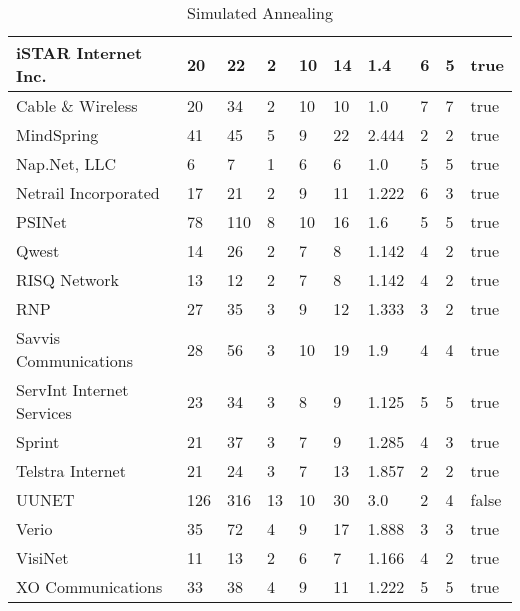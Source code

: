 \documentclass [12pt]{article}
\begin{document}
\begin {table}[H]
\begin{tabular}{ | l | l | l | l | l | l | l | l | l | l | }
    iSTAR Internet Inc. & 20 & 22 & 2 & 10 & 14 & 1.4 & 6 & 5 & true\\ \hline
    Cable \& Wireless & 20 & 34 & 2 & 10 & 10 & 1.0 & 7 & 7 & true\\ \hline
    MindSpring & 41 & 45 & 5 & 9 & 22 & 2.444 & 2 & 2 & true\\ \hline
    Nap.Net, LLC & 6 & 7 & 1 & 6 & 6 & 1.0 & 5 & 5 & true\\ \hline
    Netrail Incorporated & 17 & 21 & 2 & 9 & 11 & 1.222 & 6 & 3 & true\\ \hline
    PSINet & 78 & 110 & 8 & 10 & 16 & 1.6 & 5 & 5 & true\\ \hline
    Qwest & 14 & 26 & 2 & 7 & 8 & 1.142 & 4 & 2 & true\\ \hline
    RISQ Network & 13 & 12 & 2 & 7 & 8 & 1.142 & 4 & 2 & true\\ \hline
    RNP & 27 & 35 & 3 & 9 & 12 & 1.333 & 3 & 2 & true\\ \hline
    Savvis Communications & 28 & 56 & 3 & 10 & 19 & 1.9 & 4 & 4 & true\\ \hline
    ServInt Internet Services & 23 & 34 & 3 & 8 & 9 & 1.125 & 5 & 5 & true\\ \hline
    Sprint & 21 & 37 & 3 & 7 & 9 & 1.285 & 4 & 3 & true\\ \hline
    Telstra Internet & 21 & 24 & 3 & 7 & 13 & 1.857 & 2 & 2 & true\\ \hline
    UUNET & 126 & 316 & 13 & 10 & 30 & 3.0 & 2 & 4 & false\\ \hline
    Verio & 35 & 72 & 4 & 9 & 17 & 1.888 & 3 & 3 & true\\ \hline
    VisiNet & 11 & 13 & 2 & 6 & 7 & 1.166 & 4 & 2 & true\\ \hline
    XO Communications & 33 & 38 & 4 & 9 & 11 & 1.222 & 5 & 5 & true\\ \hline
  \end{tabular}
  \caption{Simulated Annealing}
\end{table}
\end{document}
